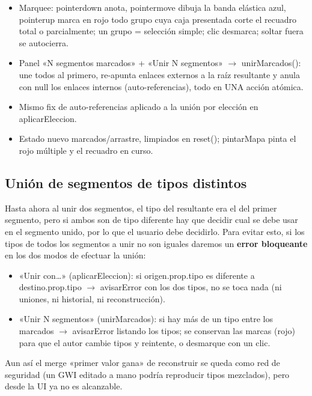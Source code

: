 \begin{itemize}
	\item Marquee: pointerdown anota, pointermove dibuja la banda elástica azul, pointerup marca en rojo todo grupo cuya caja presentada corte el recuadro total o parcialmente; un grupo = selección simple; clic desmarca; soltar fuera se autocierra.
	\item Panel «N segmentos marcados» + «Unir N segmentos» $\rightarrow$  unirMarcados(): une todos al primero, re-apunta enlaces externos a la raíz resultante y anula con null los enlaces internos (auto-referencias), todo en UNA acción atómica.
	\item Mismo fix de auto-referencias aplicado a la unión por elección en aplicarEleccion.
	\item Estado nuevo marcados/arrastre, limpiados en reset(); pintarMapa pinta el rojo múltiple y el recuadro en curso.
\end{itemize}

\subsection{Unión de segmentos de tipos distintos}
Hasta ahora al unir dos segmentos, el tipo del resultante era el del primer segmento, pero si ambos son de tipo diferente hay que decidir cual se debe usar en el segmento unido, por lo que el usuario debe decidirlo. Para evitar esto, si los tipos de todos los segmentos a unir no son iguales daremos un \textbf{error bloqueante} en los dos modos de efectuar la unión:

\begin{itemize}
	\item «Unir con…» (aplicarEleccion): si origen.prop.tipo es diferente a destino.prop.tipo $\rightarrow$ avisarError con los dos tipos, no se toca nada (ni uniones, ni historial, ni reconstrucción).
	\item «Unir N segmentos» (unirMarcados): si hay más de un tipo entre los marcados $\rightarrow$  avisarError listando los tipos; se conservan las marcas (rojo) para que el autor cambie tipos y reintente, o desmarque con un clic.
\end{itemize}

Aun así el merge «primer valor gana» de reconstruir se queda como red de seguridad (un GWI editado a mano podría reproducir tipos mezclados), pero desde la UI ya no es alcanzable.




\clearpage